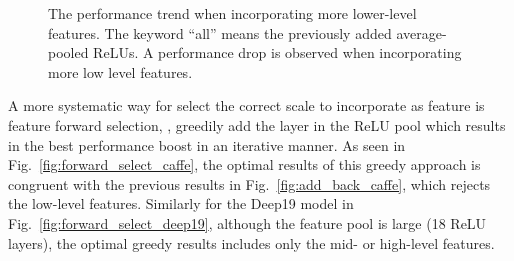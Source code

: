 \documentclass[10pt,twocolumn,letterpaper]{article}
\begin{document}
\begin{figure}[htbp]
\centering
\caption{The performance trend when incorporating more lower-level features. The keyword ``all'' means the previously added average-pooled ReLUs. A performance drop is observed when incorporating more low level features.}

\label{fig:add_back}
\end{figure}

A more systematic way for select the correct scale to incorporate as feature is feature forward selection, \ie, greedily add the layer in the ReLU pool which results in the best performance boost in an iterative manner. As seen in Fig.~\ref{fig:forward_select_caffe}, the optimal results of this greedy approach is congruent with the previous results in Fig.~\ref{fig:add_back_caffe}, which rejects the low-level features. Similarly for the Deep19 model in Fig.~\ref{fig:forward_select_deep19}, although the feature pool is large (18 ReLU layers), the optimal greedy results includes only the mid- or high-level features. 
\end{document}
